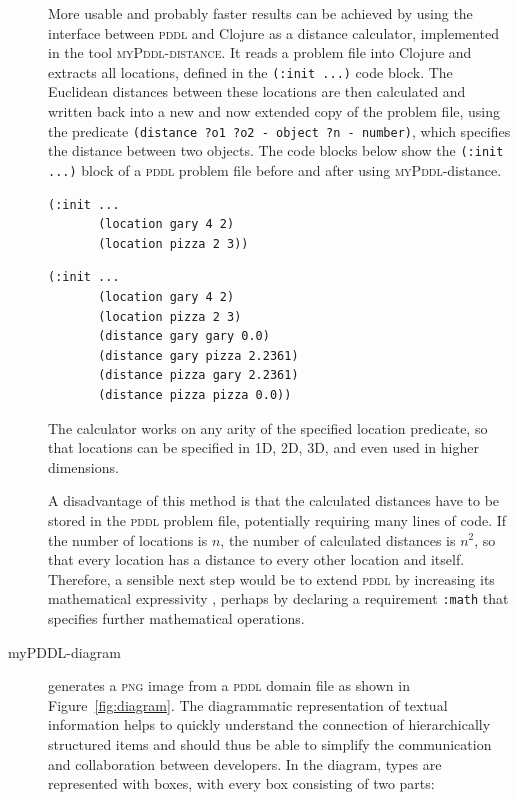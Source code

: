 \documentclass[runningheads]{llncs}
\newcommand{\mypddl}{\textsc{myPddl}\xspace}
\newcommand{\mypddldistance}{\textsc{myPddl-distance}\xspace}
\newcommand{\pddl}{\textsc{pddl}\xspace}
\begin{document}
\begin{description}
  More usable and probably faster results can be achieved by using the
  interface between \pddl and Clojure as a distance calculator,
  implemented in the tool \mypddldistance. It reads a problem file
  into Clojure and extracts all locations, defined in the
  \texttt{(:init ...)} code block. The Euclidean distances between
  these locations are then calculated and written back into a new and
  now extended copy of the problem file, using the predicate
  \texttt{(distance~?o1~?o2~-~object ?n~-~number)}, which specifies
  the distance between two objects. The code blocks below show the
  \texttt{(:init ...)} block of a \pddl problem file before and after using
  \mypddl-distance.
\begin{verbatim}
(:init ...
       (location gary 4 2)
       (location pizza 2 3))
\end{verbatim}
\begin{verbatim}
(:init ...
       (location gary 4 2)
       (location pizza 2 3)
       (distance gary gary 0.0)
       (distance gary pizza 2.2361)
       (distance pizza gary 2.2361)
       (distance pizza pizza 0.0))
\end{verbatim}

The calculator works on any arity of the specified location predicate,
so that locations can be specified in 1D, 2D, 3D, and even used in
higher dimensions.

A disadvantage of this method is that the calculated distances have to
be stored in the \pddl problem file, potentially requiring many lines
of code. If the number of locations is \(n\), the number of calculated
distances is \(n^2\), so that every location has a distance to every
other location and itself. Therefore, a sensible next step would be
to extend \pddl by increasing its mathematical expressivity
\cite{parkinson2012increasing}, perhaps by declaring a requirement
\texttt{:math} that specifies further mathematical operations.


\item[myPDDL-diagram] generates a \textsc{png} image from a \pddl
  domain file as shown in Figure~\ref{fig:diagram}. The diagrammatic
  representation of textual information helps to quickly understand
  the connection of hierarchically structured items and should thus be
  able to simplify the communication and collaboration between
  developers. In the diagram, types are represented with boxes, with
  every box consisting of two parts:


\end{description}
\end{document}
